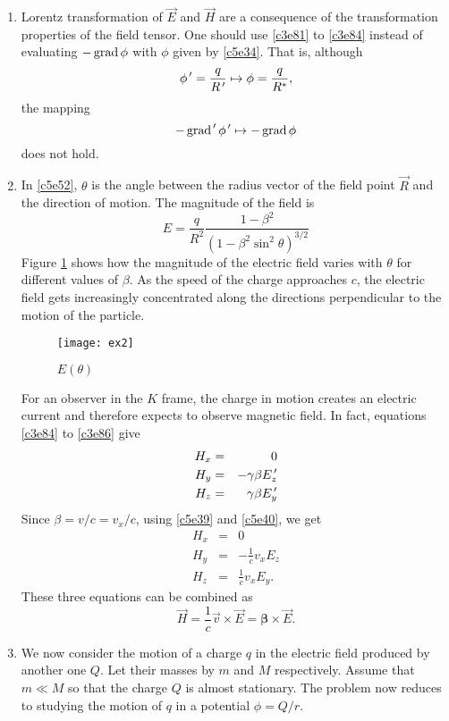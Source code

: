 \begin{enumerate}
\item Lorentz transformation of $\vec{E}$ and $\vec{H}$ are a consequence of the
transformation properties of the field tensor. One should use \eqref{c3e81} to
\eqref{c3e84} instead of evaluating $-\operatorname{grad}\phi$ with $\phi$ given by \eqref{c5e34}.
That is, although
\[
\phi^{\,\prime} = \frac{q}{R^{\,\prime}} \mapsto \phi = \frac{q}{R^\ast},
\]
the mapping
\[
-\operatorname{grad}^{\,\prime}\phi^{\,\prime} \mapsto -\operatorname{grad}\phi
\]
does not hold.

\item In \eqref{c5e52}, $\theta$ is the angle between the radius vector of the
field point $\vec{R}$ and the direction of motion. The magnitude of the field
is
\begin{equation}\label{c5e53}
E = \frac{q}{R^2}\frac{1 - \beta^2}{(1 - \beta^2\sin^2\theta)^{3/2}}
\end{equation}
Figure \ref{c5f1} shows how the magnitude of the electric field varies with 
$\theta$ for different values of $\beta$. As the speed of the charge approaches
$c$, the electric field gets increasingly concentrated along the directions
perpendicular to the motion of the particle.
\begin{figure}[!ht]
\texttt{[image: ex2]}
\caption{$E(\theta)$}
\label{c5f1}
\end{figure}
For an observer in the $K$ frame, the charge in motion creates an electric current
and therefore expects to observe magnetic field. In fact, equations \eqref{c3e84}
to \eqref{c3e86} give
\begin{eqnarray}
H_x &=& 0 \label{c5e54} \\
H_y &=& -\gamma\beta E^{\,\prime}_z \label{c5e55} \\
H_z &=& \gamma\beta E^{\,\prime}_y \label{c5e56}
\end{eqnarray}
Since $\beta = v/c = v_x/c$, using \eqref{c5e39} and \eqref{c5e40}, we get
\begin{eqnarray}
H_x &=& 0 \label{c5e57} \\
H_y &=& -\frac{1}{c}v_xE_z \label{c5e58} \\
H_z &=& \frac{1}{c}v_xE_y. \label{c5e59}
\end{eqnarray}
These three equations can be combined as
\begin{equation}\label{c5e60}
\vec{H} = \frac{1}{c}\vec{v} \times \vec{E} = \bm{\beta} \times \vec{E}.
\end{equation}

\item We now consider the motion of a charge $q$ in the electric field produced
by another one $Q$. Let their masses by $m$ and $M$ respectively. Assume that
$m \ll M$ so that the charge $Q$ is almost stationary. The problem now reduces to
studying the motion of $q$ in a potential $\phi = Q/r$.


\end{enumerate}

